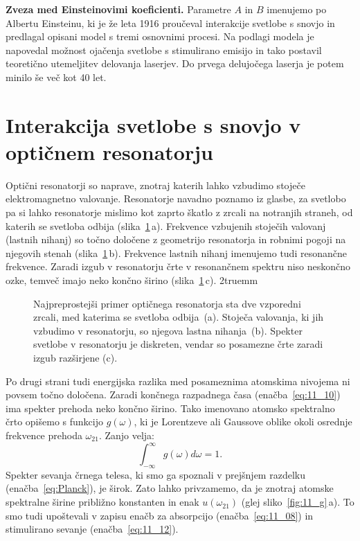 \begin{example}{\bf Zveza med Einsteinovimi koeficienti.}
Parametre $A$ in $B$ imenujemo po Albertu Einsteinu, ki je že leta 
1916 proučeval interakcije svetlobe s snovjo in predlagal opisani model s tremi osnovnimi procesi. 
Na podlagi modela je napovedal možnost ojačenja svetlobe s stimulirano 
emisijo in tako postavil teoretično utemeljitev delovanja laserjev.
Do prvega delujočega laserja je potem minilo še  več kot 40 let. 

\end{example}

\section{Interakcija svetlobe s snovjo v optičnem resonatorju}
Optični resonatorji so naprave, znotraj katerih lahko vzbudimo
stoječe elektromagnetno valovanje. Resonatorje navadno poznamo iz glasbe,
za svetlobo pa si lahko resonatorje mislimo kot zaprto škatlo
z zrcali na notranjih straneh, od katerih se svetloba 
odbija (slika~\ref{fig:11_resonator}\,a).
Frekvence vzbujenih stoječih valovanj (lastnih nihanj) so točno 
določene z geometrijo resonatorja in robnimi pogoji na njegovih 
stenah (slika~\ref{fig:11_resonator}\,b).
Frekvence lastnih nihanj imenujemo tudi resonančne frekvence. 
Zaradi izgub v resonatorju črte v resonančnem spektru niso 
neskončno ozke, temveč imajo neko končno širino
(slika~\ref{fig:11_resonator}\,c).
\vglue2truemm
\begin{figure}[ht!]
\centering
\def\svgwidth{140truemm} 

\caption{Najpreprostejši primer optičnega resonatorja sta 
dve vzporedni zrcali, med katerima se svetloba odbija~(a). Stoječa
valovanja, ki jih vzbudimo v resonatorju, so njegova lastna nihanja~(b). 
Spekter svetlobe v resonatorju je diskreten, vendar so posamezne 
črte zaradi izgub razširjene (c).
}
\label{fig:11_resonator}
\end{figure}

Po drugi strani tudi energijska razlika med posameznima atomskima nivojema 
ni povsem točno določena. Zaradi končnega razpadnega časa 
(enačba~\ref{eq:11_10}) ima spekter prehoda neko končno širino. Tako imenovano
atomsko spektralno črto opišemo s funkcijo $g(\omega)$,
ki je Lorentzeve ali Gaussove oblike okoli osrednje
frekvence prehoda $\omega_{21}$. Zanjo velja:
\begin{equation}
\int_{-\infty}^\infty g(\omega) d\omega = 1.
\label{eq:11_21}
\end{equation}
Spekter sevanja črnega telesa, ki smo ga spoznali v prejšnjem razdelku 
(enačba~\ref{eq:Planck}), je širok. Zato lahko privzamemo, da je
znotraj atomske spektralne širine približno konstanten 
in enak $u(\omega_{21})$ (glej sliko~\ref{fig:11_g}\,a).
To smo tudi upoštevali v zapisu enačb za absorpcijo (enačba~\ref{eq:11_08})
in stimulirano sevanje (enačba~\ref{eq:11_12}). 

